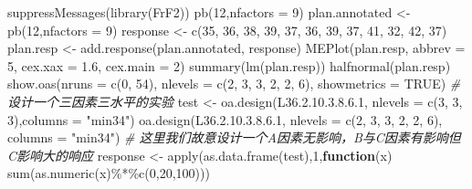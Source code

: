\documentclass[]{tufte-book}
\newenvironment{Shaded}{}{}
\newcommand{\AttributeTok}[1]{\textcolor[rgb]{0.49,0.56,0.16}{#1}}
\newcommand{\CommentTok}[1]{\textcolor[rgb]{0.38,0.63,0.69}{\textit{#1}}}
\newcommand{\ConstantTok}[1]{\textcolor[rgb]{0.53,0.00,0.00}{#1}}
\newcommand{\ControlFlowTok}[1]{\textcolor[rgb]{0.00,0.44,0.13}{\textbf{#1}}}
\newcommand{\DecValTok}[1]{\textcolor[rgb]{0.25,0.63,0.44}{#1}}
\newcommand{\FloatTok}[1]{\textcolor[rgb]{0.25,0.63,0.44}{#1}}
\newcommand{\FunctionTok}[1]{\textcolor[rgb]{0.02,0.16,0.49}{#1}}
\newcommand{\NormalTok}[1]{#1}
\newcommand{\OtherTok}[1]{\textcolor[rgb]{0.00,0.44,0.13}{#1}}
\newcommand{\SpecialCharTok}[1]{\textcolor[rgb]{0.25,0.44,0.63}{#1}}
\newcommand{\StringTok}[1]{\textcolor[rgb]{0.25,0.44,0.63}{#1}}
\begin{document}
\begin{Shaded}
\begin{Highlighting}[]
\FunctionTok{suppressMessages}\NormalTok{(}\FunctionTok{library}\NormalTok{(FrF2))}
\FunctionTok{pb}\NormalTok{(}\DecValTok{12}\NormalTok{,}\AttributeTok{nfactors =} \DecValTok{9}\NormalTok{)}
\NormalTok{plan.annotated }\OtherTok{\textless{}{-}} \FunctionTok{pb}\NormalTok{(}\DecValTok{12}\NormalTok{,}\AttributeTok{nfactors =} \DecValTok{9}\NormalTok{)}
\NormalTok{response }\OtherTok{\textless{}{-}} \FunctionTok{c}\NormalTok{(}\DecValTok{35}\NormalTok{, }\DecValTok{36}\NormalTok{, }\DecValTok{38}\NormalTok{, }\DecValTok{39}\NormalTok{, }\DecValTok{37}\NormalTok{, }\DecValTok{36}\NormalTok{, }\DecValTok{39}\NormalTok{, }\DecValTok{37}\NormalTok{, }\DecValTok{41}\NormalTok{, }\DecValTok{32}\NormalTok{, }\DecValTok{42}\NormalTok{, }\DecValTok{37}\NormalTok{)}
\NormalTok{plan.resp }\OtherTok{\textless{}{-}} \FunctionTok{add.response}\NormalTok{(plan.annotated, response)}
\FunctionTok{MEPlot}\NormalTok{(plan.resp, }\AttributeTok{abbrev =} \DecValTok{5}\NormalTok{, }\AttributeTok{cex.xax =} \FloatTok{1.6}\NormalTok{, }\AttributeTok{cex.main =} \DecValTok{2}\NormalTok{)}
\FunctionTok{summary}\NormalTok{(}\FunctionTok{lm}\NormalTok{(plan.resp))}
\FunctionTok{halfnormal}\NormalTok{(plan.resp)}
\FunctionTok{show.oas}\NormalTok{(}\AttributeTok{nruns =} \FunctionTok{c}\NormalTok{(}\DecValTok{0}\NormalTok{, }\DecValTok{54}\NormalTok{), }\AttributeTok{nlevels =} \FunctionTok{c}\NormalTok{(}\DecValTok{2}\NormalTok{, }\DecValTok{3}\NormalTok{, }\DecValTok{3}\NormalTok{, }\DecValTok{2}\NormalTok{, }\DecValTok{2}\NormalTok{, }\DecValTok{6}\NormalTok{), }\AttributeTok{showmetrics =} \ConstantTok{TRUE}\NormalTok{)}
\CommentTok{\# 设计一个三因素三水平的实验}
\NormalTok{test }\OtherTok{\textless{}{-}} \FunctionTok{oa.design}\NormalTok{(L36.}\DecValTok{2}\NormalTok{.}\DecValTok{10}\NormalTok{.}\DecValTok{3}\NormalTok{.}\DecValTok{8}\NormalTok{.}\FloatTok{6.1}\NormalTok{, }\AttributeTok{nlevels =} \FunctionTok{c}\NormalTok{(}\DecValTok{3}\NormalTok{, }\DecValTok{3}\NormalTok{, }\DecValTok{3}\NormalTok{),}\AttributeTok{columns =} \StringTok{"min34"}\NormalTok{)}
\FunctionTok{oa.design}\NormalTok{(L36.}\DecValTok{2}\NormalTok{.}\DecValTok{10}\NormalTok{.}\DecValTok{3}\NormalTok{.}\DecValTok{8}\NormalTok{.}\FloatTok{6.1}\NormalTok{, }\AttributeTok{nlevels =} \FunctionTok{c}\NormalTok{(}\DecValTok{2}\NormalTok{, }\DecValTok{3}\NormalTok{, }\DecValTok{3}\NormalTok{, }\DecValTok{2}\NormalTok{, }\DecValTok{2}\NormalTok{, }\DecValTok{6}\NormalTok{), }\AttributeTok{columns =} \StringTok{"min34"}\NormalTok{)}
\CommentTok{\# 这里我们故意设计一个A因素无影响，B与C因素有影响但C影响大的响应}
\NormalTok{response }\OtherTok{\textless{}{-}} \FunctionTok{apply}\NormalTok{(}\FunctionTok{as.data.frame}\NormalTok{(test),}\DecValTok{1}\NormalTok{,}\ControlFlowTok{function}\NormalTok{(x) }\FunctionTok{sum}\NormalTok{(}\FunctionTok{as.numeric}\NormalTok{(x)}\SpecialCharTok{\%*\%}\FunctionTok{c}\NormalTok{(}\DecValTok{0}\NormalTok{,}\DecValTok{20}\NormalTok{,}\DecValTok{100}\NormalTok{)))}

\end{Highlighting}
\end{Shaded}
\end{document}
